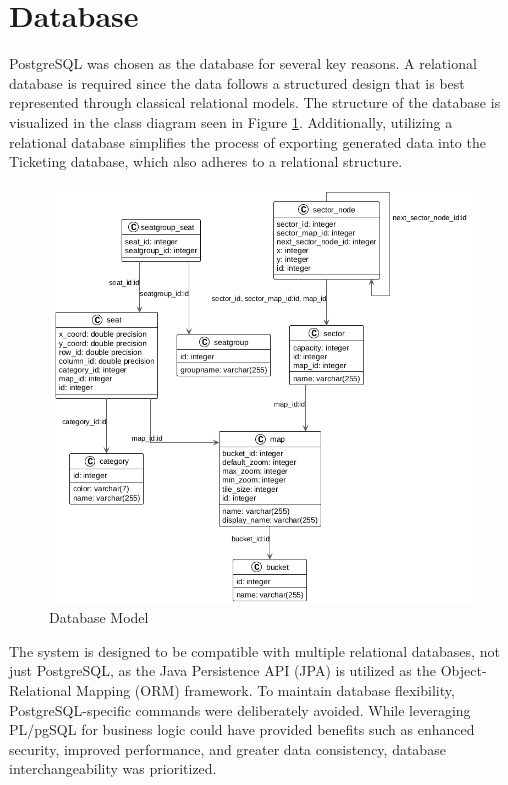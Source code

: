 \section{Database}
PostgreSQL was chosen as the database for several key reasons. A relational database is required since the data follows a structured design that is best represented through classical relational models. The structure of the database is visualized in the class diagram seen in Figure \ref{fig:db_model}. Additionally, utilizing a relational database simplifies the process of exporting generated data into the Ticketing database, which also adheres to a relational structure.

\begin{figure} [H]
    \centering
    \includegraphics[scale=0.5]{pics/db_model.png}
    \caption{Database Model}
    \label{fig:db_model}
\end{figure}

The system is designed to be compatible with multiple relational databases, not just PostgreSQL, as the Java Persistence API (JPA) is utilized as the Object-Relational Mapping (ORM) framework. To maintain database flexibility, PostgreSQL-specific commands were deliberately avoided. While leveraging PL/pgSQL for business logic could have provided benefits such as enhanced security, improved performance, and greater data consistency, database interchangeability was prioritized.

